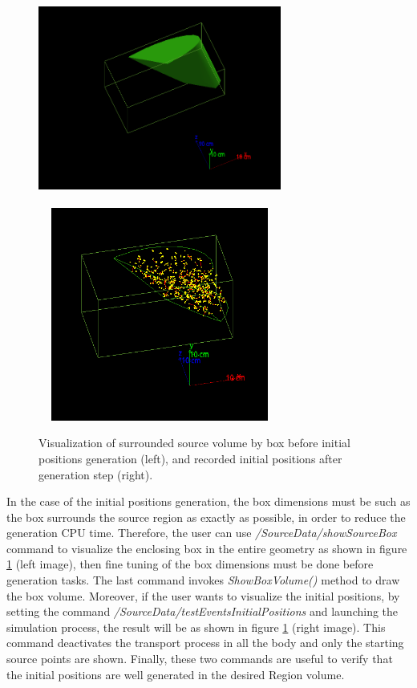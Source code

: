 \documentclass[letterpaper,12pt]{article}
\begin{document}
\begin{figure}[H] \centering
    \includegraphics[width=8cm,height=7cm]{BoxSurrendVolume.png}
    \includegraphics[width=8cm,height=7cm]{BoxPointsTestVisualization.png} 
    \caption{Visualization of surrounded source volume by box before initial positions generation (left), and recorded initial positions after generation step (right).}
    \label{VisVolumeAndTestPoint}
\end{figure}

In the case of the initial positions generation, the box dimensions must be such as the box surrounds the source region as exactly as possible, in order to reduce the generation CPU time. Therefore, the user can use \textit{/SourceData/showSourceBox} command to visualize the enclosing box in the entire geometry as shown in figure \ref{VisVolumeAndTestPoint} (left image), then fine tuning of the box dimensions must be done before generation tasks. The last command invokes \textit{ShowBoxVolume()} method to draw the box volume. Moreover, if the user wants to visualize the initial positions, by setting the command \textit{/SourceData/testEventsInitialPositions} and launching the simulation process, the result will be as shown in figure \ref{VisVolumeAndTestPoint} (right image). This command deactivates the transport process in all the body and only the starting source points are shown. Finally, these two commands are useful to verify that the initial positions are well generated in the desired Region volume. 
\end{document}
